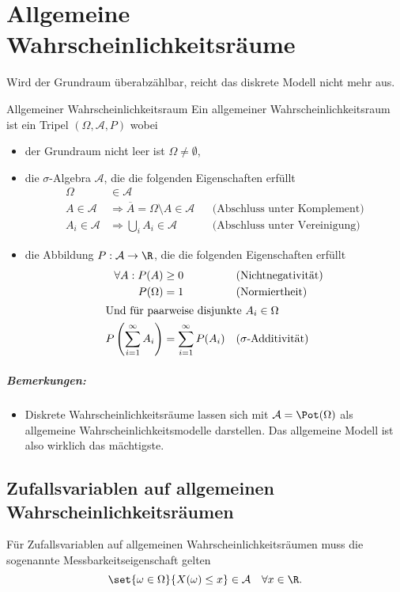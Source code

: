 \chapter{Allgemeine Wahrscheinlichkeitsräume}
Wird der Grundraum überabzählbar, reicht das diskrete Modell nicht mehr aus.

\begin{definition}{Allgemeiner Wahrscheinlichkeitsraum}
	Ein allgemeiner Wahrscheinlichkeitsraum ist ein Tripel $(\Omega, \mathcal A, P)$ wobei
	\begin{itemize}
		\item der Grundraum nicht leer ist $\Omega\neq\emptyset$,
		\item die $\sigma$-Algebra $\mathcal A$, die die folgenden Eigenschaften erfüllt
		\begin{align}
			\Omega&\in\mathcal A\\
			A\in\mathcal A&\Rightarrow \overline A=\Omega\setminus A\in \mathcal A && \text{(Abschluss unter Komplement)}\\
			A_i\in \mathcal A&\Rightarrow \bigcup_i A_i\in \mathcal A && \text{(Abschluss unter Vereinigung)}
		\end{align}
		\item die Abbildung $P:\mathcal A\rightarrow \R$, die die folgenden Eigenschaften erfüllt
		\begin{align}
			\forall A:P(A)&\geq 0 && \text{(Nichtnegativität)}\\
			P(\Omega)&=1 &&\text{(Normiertheit)}\\
			\intertext{Und für paarweise disjunkte $A_i\in\Omega$}
			P\left(\sum_{i=1}^\infty A_i\right)&=\sum_{i=1}^\infty P(A_i) &&\text{($\sigma$-Additivität)}
		\end{align}
	\end{itemize}
\end{definition}
\paragraph{Bemerkungen:}
\begin{itemize}
	\item Diskrete Wahrscheinlichkeitsräume lassen sich mit $\mathcal A=\Pot(\Omega)$ als allgemeine Wahrscheinlichkeitsmodelle darstellen. Das allgemeine Modell ist also wirklich das mächtigste.
\end{itemize}

\section{Zufallsvariablen auf allgemeinen Wahrscheinlichkeitsräumen}
Für Zufallsvariablen auf allgemeinen Wahrscheinlichkeitsräumen muss die sogenannte Messbarkeitseigenschaft gelten
\begin{equation*}
	\set{\omega\in\Omega}{X(\omega)\leq x}\in \mathcal A\quad\forall x\in\R.
\end{equation*}

